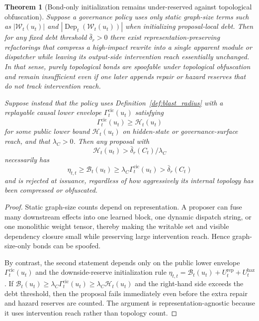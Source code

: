 \documentclass[11pt]{article}
\newtheorem{theorem}{Theorem}[section]
\theoremstyle{definition}
\newcommand{\1}{\mathbf{1}}
\begin{document}
\begin{theorem}[Bond-only initialization remains under-reserved against topological obfuscation]\label{thm:causal_bond}
Suppose a governance policy uses only static graph-size terms such as $|\mathcal W_t(u_t)|$ and $|\operatorname{Dep}_t(\mathcal W_t(u_t))|$ when initializing proposal-local debt. Then for any fixed debt threshold $\bar\delta_r>0$ there exist representation-preserving refactorings that compress a high-impact rewrite into a single apparent module or dispatcher while leaving its output-side intervention reach essentially unchanged. In that sense, purely topological bonds are spoofable under topological obfuscation and remain insufficient even if one later appends repair or hazard reserves that do not track intervention reach.

Suppose instead that the policy uses Definition~\ref{def:blast_radius} with a replayable causal lower envelope $\Gamma_t^{\mathrm{cic}}(u_t)$ satisfying
\[
\Gamma_t^{\mathrm{cic}}(u_t)\ge \mathcal H_t(u_t)
\]
for some public lower bound $\mathcal H_t(u_t)$ on hidden-state or governance-surface reach, and that $\lambda_C>0$. Then any proposal with
\[
\mathcal H_t(u_t)>\bar\delta_r(C_t)/\lambda_C
\]
necessarily has
\[
\eta_{t,t}\ge \mathcal B_t(u_t)\ge \lambda_C\Gamma_t^{\mathrm{cic}}(u_t)>\bar\delta_r(C_t)
\]
and is rejected at issuance, regardless of how aggressively its internal topology has been compressed or obfuscated.
\end{theorem}

\begin{proof}
Static graph-size counts depend on representation. A proposer can fuse many downstream effects into one learned block, one dynamic dispatch string, or one monolithic weight tensor, thereby making the writable set and visible dependency closure small while preserving large intervention reach. Hence graph-size-only bonds can be spoofed.

By contrast, the second statement depends only on the public lower envelope $\Gamma_t^{\mathrm{cic}}(u_t)$ and the downside-reserve initialization rule $\eta_{t,t}=\mathcal B_t(u_t)+U_t^{\mathrm{rep}}+U_t^{\mathrm{haz}}$. If $\mathcal B_t(u_t)\ge \lambda_C\Gamma_t^{\mathrm{cic}}(u_t)\ge \lambda_C\mathcal H_t(u_t)$ and the right-hand side exceeds the debt threshold, then the proposal fails immediately even before the extra repair and hazard reserves are counted. The argument is representation-agnostic because it uses intervention reach rather than topology count.
\end{proof}
\end{document}
